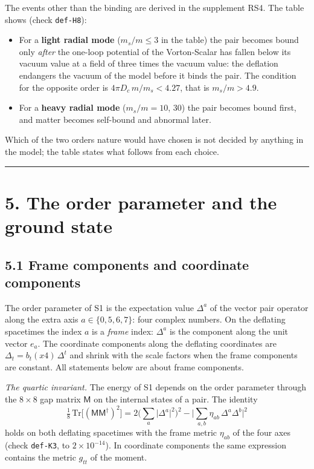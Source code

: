 \documentclass[
  10pt,
]{article}
\providecommand{\tightlist}{%
  \setlength{\itemsep}{0pt}\setlength{\parskip}{0pt}}
\begin{document}
The events other than the binding are derived in the supplement RS4. The
table shows (check \texttt{def-H8}):

\begin{itemize}
\tightlist
\item
  For a \textbf{light radial mode} (\(m_s/m\le3\) in the table) the pair
  becomes bound only \emph{after} the one-loop potential of the
  Vorton-Scalar has fallen below its vacuum value at a field of three
  times the vacuum value: the deflation endangers the vacuum of the
  model before it binds the pair. The condition for the opposite order
  is \(4\pi D_c\,m/m_s<4.27\), that is \(m_s/m>4.9\).
\item
  For a \textbf{heavy radial mode} (\(m_s/m=10\), \(30\)) the pair
  becomes bound first, and matter becomes self-bound and abnormal later.
\end{itemize}

Which of the two orders nature would have chosen is not decided by
anything in the model; the table states what follows from each choice.

\begin{center}\rule{0.5\linewidth}{0.5pt}\end{center}

\hypertarget{the-order-parameter-and-the-ground-state}{%
\section{5. The order parameter and the ground
state}\label{the-order-parameter-and-the-ground-state}}

\hypertarget{frame-components-and-coordinate-components}{%
\subsection{5.1 Frame components and coordinate
components}\label{frame-components-and-coordinate-components}}

The order parameter of S1 is the expectation value \(\Delta^a\) of the
vector pair operator along the extra axis \(a\in\{0,5,6,7\}\): four
complex numbers. On the deflating spacetimes the index \(a\) is a
\emph{frame} index: \(\Delta^a\) is the component along the unit vector
\(e_a\). The coordinate components along the deflating coordinates are
\(\Delta_t=b_t(x4)\,\Delta^t\) and shrink with the scale factors when
the frame components are constant. All statements below are about frame
components.

\emph{The quartic invariant.} The energy of S1 depends on the order
parameter through the \(8\times8\) gap matrix \(\mathsf M\) on the
internal states of a pair. The identity
\[\tfrac18\,\mathrm{Tr}\big[(\mathsf M\mathsf M^\dagger)^2\big]
=2\Big(\sum_a\lvert\Delta^a\rvert^2\Big)^2-\Big\lvert\sum_{a,b}\eta_{ab}\,\Delta^a\Delta^b\Big\rvert^2\tag{5.1}\]
holds on both deflating spacetimes with the frame metric \(\eta_{ab}\)
of the four axes (check \texttt{def-K3}, to \(2\times10^{-14}\)). In
coordinate components the same expression contains the metric \(g_{tt}\)
of the moment.
\end{document}
